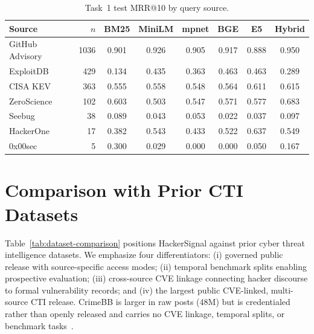 \documentclass{article}
\begin{document}
\begin{table}[ht]
\centering
\small
\setlength{\tabcolsep}{4pt}
\caption{Task~1 test MRR@10 by query source.}
\label{tab:per-source}
\begin{tabular}{lrcccccc}
\toprule
\textbf{Source} & \textbf{$n$} & \textbf{BM25} & \textbf{MiniLM} & \textbf{mpnet} & \textbf{BGE} & \textbf{E5} & \textbf{Hybrid} \\
\midrule
GitHub Advisory & 1036 & 0.901 & 0.926 & 0.905 & 0.917 & 0.888 & 0.950 \\
ExploitDB & 429 & 0.134 & 0.435 & 0.363 & 0.463 & 0.463 & 0.289 \\
CISA KEV & 363 & 0.555 & 0.558 & 0.548 & 0.564 & 0.611 & 0.615 \\
ZeroScience & 102 & 0.603 & 0.503 & 0.547 & 0.571 & 0.577 & 0.683 \\
Seebug & 38 & 0.089 & 0.043 & 0.053 & 0.022 & 0.037 & 0.097 \\
HackerOne & 17 & 0.382 & 0.543 & 0.433 & 0.522 & 0.637 & 0.549 \\
0x00sec & 5 & 0.300 & 0.029 & 0.000 & 0.000 & 0.050 & 0.167 \\
\bottomrule
\end{tabular}
\end{table}

\section{Comparison with Prior CTI Datasets}
\label{app:comparison}

Table~\ref{tab:dataset-comparison} positions HackerSignal against prior cyber threat intelligence datasets. We emphasize four differentiators: (i) governed public release with source-specific access modes; (ii) temporal benchmark splits enabling prospective evaluation; (iii) cross-source CVE linkage connecting hacker discourse to formal vulnerability records; and (iv) the largest public CVE-linked, multi-source CTI release. CrimeBB is larger in raw posts (48M) but is credentialed rather than openly released and carries no CVE linkage, temporal splits, or benchmark tasks~\citep{crimebb2018}.
\end{document}
